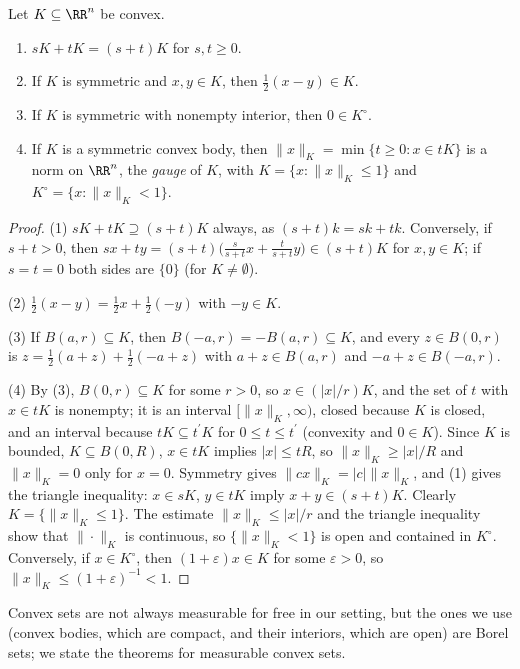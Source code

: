 \begin{lemma}\label{geometry-of-numbers:lemma-convex-basic}
Let $K \subseteq \RR^n$ be convex.
\begin{enumerate}
\item $sK + tK = (s + t)K$ for $s, t \geq 0$.
\item If $K$ is symmetric and $x, y \in K$, then $\frac12(x - y) \in K$.
\item If $K$ is symmetric with nonempty interior, then $0 \in K^\circ$.
\item If $K$ is a symmetric convex body, then $\|x\|_K = \min\{t \geq 0 : x \in tK\}$ is a norm on $\RR^n$, the \emph{gauge} of $K$, with $K = \{x : \|x\|_K \leq 1\}$ and
$K^\circ = \{x : \|x\|_K < 1\}$.
\end{enumerate}
\end{lemma}

\begin{proof}
(1) $sK + tK \supseteq (s + t)K$ always, as $(s + t)k = sk + tk$. Conversely, if $s + t > 0$, then $sx + ty = (s + t)\bigl(\frac{s}{s + t}x + \frac{t}{s + t}y\bigr) \in (s + t)K$ for $x, y \in K$; if
$s = t = 0$ both sides are $\{0\}$ (for $K \neq \emptyset$).

(2) $\frac12(x - y) = \frac12x + \frac12(-y)$ with $-y \in K$.

(3) If $B(a, r) \subseteq K$, then $B(-a, r) = -B(a, r) \subseteq K$, and every $z \in B(0, r)$ is $z = \frac12(a + z) + \frac12(-a + z)$ with $a + z \in B(a, r)$ and $-a + z \in B(-a, r)$.

(4) By (3), $B(0, r) \subseteq K$ for some $r > 0$, so $x \in (|x|/r)K$, and the set of $t$ with $x \in tK$ is nonempty; it is an interval $[\|x\|_K, \infty)$, closed because $K$ is closed, and an interval
because $tK \subseteq t^{\prime}K$ for $0 \leq t \leq t^{\prime}$ (convexity and $0 \in K$). Since $K$ is bounded, $K \subseteq B(0, R)$, $x \in tK$ implies $|x| \leq tR$, so $\|x\|_K \geq |x|/R$ and
$\|x\|_K = 0$ only for $x = 0$. Symmetry gives $\|cx\|_K = |c|\|x\|_K$, and (1) gives the triangle inequality: $x \in sK$, $y \in tK$ imply $x + y \in (s + t)K$. Clearly $K = \{\|x\|_K \leq 1\}$. The
estimate $\|x\|_K \leq |x|/r$ and the triangle inequality show that $\|\cdot\|_K$ is continuous, so $\{\|x\|_K < 1\}$ is open and contained in $K^\circ$. Conversely, if $x \in K^\circ$, then
$(1 + \varepsilon)x \in K$ for some $\varepsilon > 0$, so $\|x\|_K \leq (1 + \varepsilon)^{-1} < 1$.
\end{proof}

Convex sets are not always measurable for free in our setting, but the ones we use (convex bodies, which are compact, and their interiors, which are open) are Borel sets; we state the theorems for
measurable convex sets.

